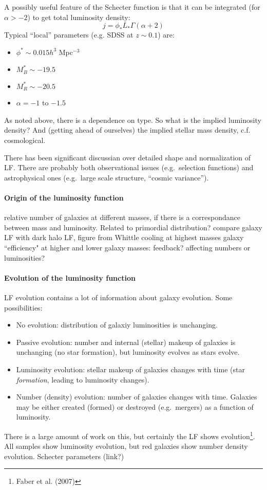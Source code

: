 \documentclass{article}
\newcommand{\mynotes}[1]{\textcolor{cadmiumgreen}{#1}}
\begin{document}
A possibly useful feature of the Schecter function is that it can be
integrated (for $\alpha > -2$) to get total luminosity density:
\[
    j = \phi_{*}L_{*}\Gamma\left(\alpha + 2\right)
    \]
Typical ``local'' parameters (e.g. SDSS at $z\sim0.1$) are:
\begin{itemize}
    \item $\phi^{*}\sim0.015h^{3}$ Mpc$^{-3}$
    \item $M_{B}^{*}\sim-19.5$
    \item $M_{R}^{*}\sim-20.5$
    \item $\alpha=-1$ to $-1.5$
\end{itemize}
As noted above, there is a dependence on type. So what is the implied
luminosity density? And (getting ahead of ourselves) the implied stellar
mass density, c.f. cosmological.

There has been significant discussian over detailed shape and normalization of
LF\@.  There are probably both observational issues (e.g.\ selection functions)
and astrophysical ones (e.g.\ large scale structure, ``cosmic variance'').

\paragraph{Origin of the luminosity function}
relative number of galaxies at different masses, if there is a
correspondance between mass and luminosity. Related to primordial
distribution?
compare galaxy LF with dark halo LF, figure from Whittle
cooling at highest masses
galaxy ``efficiency" at higher and lower galaxy masses: feedback? affecting
numbers or luminosities?

\paragraph{Evolution of the luminosity function}
LF evolution contains a lot of information about galaxy evolution.
Some possibilities:
\begin{itemize}
    \item No evolution: distribution of galaxiy luminosities is unchanging.
    \item Passive evolution: number and internal (stellar) makeup of
        galaxies is unchanging \mynotes{(no star formation)},
        but luminosity evolves as stars evolve.
    \item Luminosity evolution: stellar makeup of galaxies changes with
        time (star \emph{formation}, leading to luminosity changes).
    \item Number (density) evolution: number of galaxies changes with time.
        Galaxies may be either created (formed) or destroyed (e.g.\
        mergers) as a function of luminosity.
\end{itemize}
There is a large amount of work on this, but certainly the LF shows
evolution\footnote{Faber et al. (2007)}. All samples show luminosity
evolution, but red galaxies show number density evolution.
Schecter parameters (link?)
\end{document}
